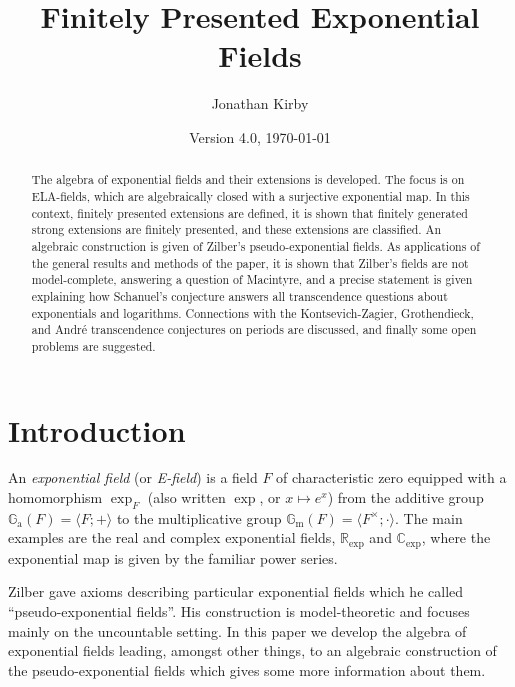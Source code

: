 \documentclass[12pt]{amsart}
\title{Finitely Presented Exponential Fields}
\author{Jonathan Kirby}
\date{Version 4.0, \today}
\theoremstyle{definition}
\begin{document}
\begin{abstract}
  The algebra of exponential fields and their extensions is developed. The focus is on ELA-fields, which are algebraically closed with a surjective exponential map. In this context, finitely presented extensions are defined, it is shown that finitely generated strong extensions are finitely presented, and these extensions are classified. An algebraic construction is given of Zilber's pseudo-exponential fields. As applications of the general results and methods of the paper, it is shown that Zilber's fields are not model-complete, answering a question of Macintyre, and a precise statement is given explaining how Schanuel's conjecture answers all transcendence questions about exponentials and logarithms. Connections with the Kontsevich-Zagier, Grothendieck, and Andr\'e transcendence conjectures on periods are discussed, and finally some open problems are suggested.
\end{abstract}

\maketitle

\setcounter{tocdepth}{1}
\tableofcontents

\section{Introduction}

  An \emph{exponential field} (or \emph{E-field}) is a field $F$ of characteristic zero equipped
  with a homomorphism $\exp_F$ (also written $\exp$, or $x \mapsto
  e^x$) from the additive group ${\ensuremath{\mathbb{G}_\mathrm{a}}}(F) = {\ensuremath{\langle {F;+} \rangle}}$ to the multiplicative group ${\ensuremath{\mathbb{G}_\mathrm{m}}}(F) = {\ensuremath{\langle {F^\times;\cdot} \rangle}}$.
The main examples are the real and complex exponential fields, ${\ensuremath{\mathbb{R}_{\mathrm{exp}}}}$ and ${\ensuremath{\mathbb{C}_{\mathrm{exp}}}}$, where the exponential map is given by the familiar power series. 

Zilber \cite{Zilber05peACF0} gave axioms describing particular exponential fields which he called ``pseudo-exponential fields''. His construction is model-theoretic and focuses mainly on the uncountable setting. In this paper we develop the algebra of exponential fields leading, amongst other things, to an algebraic construction of the pseudo-exponential fields which gives some more information about them. 
\end{document}
